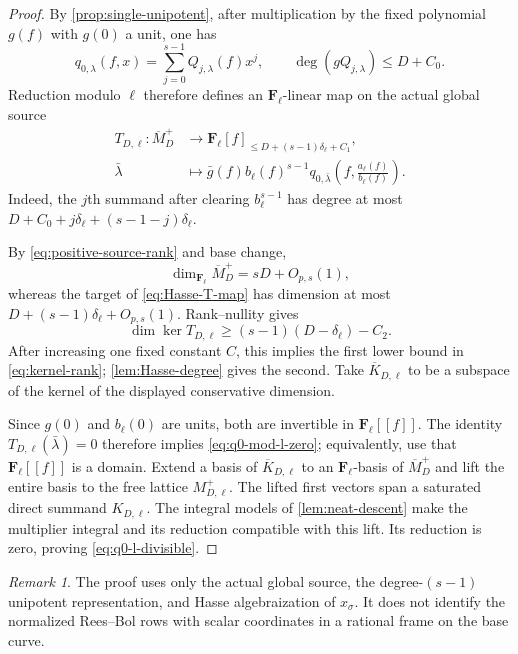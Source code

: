 \documentclass[11pt]{article}
\theoremstyle{definition}
\theoremstyle{remark}
\newtheorem{remark}[remark]{Remark}
\newcommand{\F}{\mathbf F}
\begin{document}
\begin{proof}
By \cref{prop:single-unipotent}, after multiplication by the fixed polynomial
$g(f)$ with $g(0)$ a unit, one has
\[
 q_{0,\lambda}(f,x)=\sum_{j=0}^{s-1}Q_{j,\lambda}(f)x^j,
 \qquad
 \deg(gQ_{j,\lambda})\le D+C_0.
\]
Reduction modulo $\ell$ therefore defines an $\F_\ell$-linear map on the
actual global source
\begin{align}
 T_{D,\ell}:\overline M_D^+&\longrightarrow
 \F_\ell[f]_{\le D+(s-1)\delta_\ell+C_1},\label{eq:Hasse-T-map}\\
 \bar\lambda&\longmapsto
 \bar g(f)b_\ell(f)^{s-1}
 q_{0,\bar\lambda}\!\left(f,\frac{a_\ell(f)}{b_\ell(f)}\right).
 \nonumber
\end{align}
Indeed, the $j$th summand after clearing $b_\ell^{s-1}$ has degree at most
$D+C_0+j\delta_\ell+(s-1-j)\delta_\ell$.

By \eqref{eq:positive-source-rank} and base change,
\[
 \dim_{\F_\ell}\overline M_D^+=sD+O_{p,s}(1),
\]
whereas the target of \eqref{eq:Hasse-T-map} has dimension at most
$D+(s-1)\delta_\ell+O_{p,s}(1)$.  Rank--nullity gives
\[
 \dim\ker T_{D,\ell}
 \ge(s-1)(D-\delta_\ell)-C_2.
\]
After increasing one fixed constant $C$, this implies the first lower bound
in \eqref{eq:kernel-rank}; \cref{lem:Hasse-degree} gives the second.  Take
$\overline K_{D,\ell}$ to be a subspace of the kernel of the displayed
conservative dimension.

Since $g(0)$ and $b_\ell(0)$ are units, both are invertible in
$\F_\ell[[f]]$.  The identity $T_{D,\ell}(\bar\lambda)=0$ therefore implies
\eqref{eq:q0-mod-l-zero}; equivalently, use that
$\F_\ell[[f]]$ is a domain.  Extend a basis of
$\overline K_{D,\ell}$ to an $\F_\ell$-basis of
$\overline M_D^+$ and lift the entire basis to the free lattice
$M_{D,\ell}^+$.  The lifted first vectors span a saturated direct summand
$K_{D,\ell}$.  The integral models of \cref{lem:neat-descent} make the
multiplier integral and its reduction compatible with this lift.  Its
reduction is zero, proving \eqref{eq:q0-l-divisible}.
\end{proof}

\begin{remark}
The proof uses only the actual global source, the degree-$(s-1)$ unipotent
representation, and Hasse algebraization of $x_\sigma$.  It does not identify
the normalized Rees--Bol rows with scalar coordinates in a rational frame on
the base curve.
\end{remark}
\end{document}
